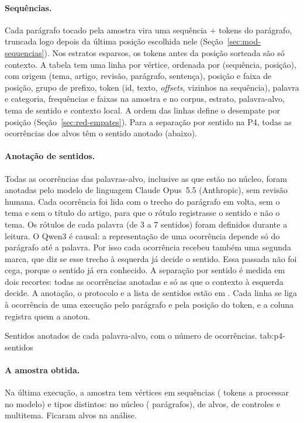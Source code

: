 \paragraph{Sequências.} Cada parágrafo tocado pela amostra vira uma sequência
 $+$ tokens do parágrafo, truncada logo depois da última posição escolhida
nele (Seção~\ref{sec:mod-sequencias}). Nos estratos esparsos, os tokens antes da posição
sorteada são só contexto. A tabela  tem uma linha por vértice, ordenada
por (sequência, posição), com origem (tema, artigo, revisão, parágrafo, sentença), posição e
faixa de posição, grupo de prefixo, token (id, texto, \emph{offsets}, vizinhos na sequência),
palavra e categoria, frequências e faixas na amostra e no corpus, estrato, palavra-alvo, tema
de sentido e contexto local. A ordem das linhas define o desempate por posição
(Seção~\ref{sec:red-empates}). Para a separação por sentido na P4, todas as ocorrências dos
alvos têm o sentido anotado (abaixo).

\paragraph{Anotação de sentidos.}\label{sec:dados-sentidos} Todas as ocorrências das
palavras-alvo, inclusive as que estão no núcleo, foram anotadas pelo modelo de linguagem Claude
Opus~5.5 (Anthropic), sem revisão humana. Cada ocorrência foi lida com o trecho do parágrafo em
volta, sem o tema e sem o título do artigo, para que o rótulo registrasse o sentido e não o
tema. Os rótulos de cada palavra (de 3 a 7 sentidos) foram definidos durante a leitura. O Qwen3 é causal: a representação de uma ocorrência depende só do
parágrafo até a palavra. Por isso cada ocorrência recebeu também uma segunda marca, que diz se
esse trecho à esquerda já decide o sentido. Essa passada não foi cega, porque o sentido já era
conhecido. A separação por sentido é medida em dois recortes: todas as ocorrências anotadas e
só as que o contexto à esquerda decide. A anotação, o protocolo e a lista de sentidos estão em
. Cada linha se liga à ocorrência de uma execução pelo parágrafo e pela
posição do token, e a coluna  registra quem a anotou.

    {Sentidos anotados de cada palavra-alvo, com o número de ocorrências.}
    {tab:p4-sentidos}

\paragraph{A amostra obtida.} Na última execução, a amostra tem \nVertices{} vértices em
\nSequencias{} sequências (\nTokensProcessados{} tokens a processar no modelo) e \nTipos{}
tipos distintos: \nVerticesNucleo{} no núcleo (\nParagrafosNucleo{} parágrafos),
\nVerticesAlvo{} de alvos, \nVerticesControle{} de controles e \nVerticesMultitema{}
multitema. Ficaram \nAlvosMantidos{} alvos na análise.

